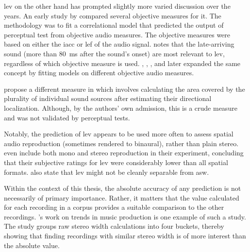 \gls{lev} on the other hand has prompted slightly more varied discussion over the years. An early study by  compared several objective measures for it. The methodology was to fit a correlational model that predicted the output of perceptual test from objective audio measures. The objective measures were based on either the \gls{iacc} or \gls{lef} of the audio signal. \citeauthor{soulodreNewObjectiveMeasures2004} notes that the late-arriving sound (more than \SI{80}{\ms} after the sound's onset) are most relevant to \gls{lev}, regardless of which objective measure is used. , , , and  later expanded the same concept by fitting models on different objective audio measures. 

\citeauthor{dewhirstObjectiveAssessmentSpatial2005} propose a different measure in \cite{dewhirstObjectiveAssessmentSpatial2005} which involves calculating the area covered by the plurality of individual sound sources after estimating their directional localization. Although, by the authors' own admission, this is a crude measure and was not validated by perceptual tests.

Notably, the prediction of \gls{lev} appears to be used more often to assess spatial audio reproduction (sometimes rendered to binaural), rather than plain stereo.  even include both mono and stereo reproduction in their experiment, concluding that their subjective ratings for \gls{lev} were considerably lower than all spatial formats.  also state that \gls{lev} might not be cleanly separable from \gls{asw}.

Within the context of this thesis, the absolute accuracy of any prediction is not necessarily of primary importance. Rather, it matters that the value calculated for each recording in a corpus provides a suitable comparison to the other recordings. \citeauthor{mourgelaExploringTrendsAudio2024}'s work on trends in music production \cite{mourgelaExploringTrendsAudio2024} is one example of such a study. The study groups raw stereo width calculations into four buckets, thereby showing that finding recordings with similar stereo width is of more interest than the absolute value.


